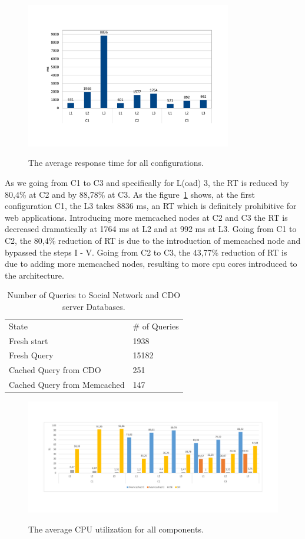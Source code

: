 \begin{figure}[h]
	\caption{The average response time for all configurations.}
	\includegraphics[width=0.8\textwidth,natwidth=200,natheight=150]{./fig/RTavg.pdf}
	\centering
	\label{fig:rtavg}
\end{figure}

As we going from C1 to C3 and specifically for L(oad) 3, the RT is reduced by 80,4\% at C2 and by 88,78\% at C3. As the figure~\ref{fig:rtavg} shows, at the first configuration C1, the L3 takes 8836 ms, an RT which is definitely prohibitive for web applications. Introducing more memcached nodes at C2 and C3 the RT is decreased dramatically at 1764 ms at L2 and at 992 ms at L3. Going from C1 to C2, the 80,4\% reduction of RT is due to the introduction of memcached node and bypassed the steps I - V. Going from C2 to C3, the 43,77\% reduction of RT is due to adding more memcached nodes, resulting to more cpu cores  introduced to the architecture.

\begin{table}[]
\centering
\caption{Number of Queries to Social Network and CDO server Databases.}
\label{tab:num_of_queries}
\begin{tabular}{ll}
State        & \# of Queries \\
Fresh start  & 1938          \\
Fresh Query  & 15182         \\
Cached Query from CDO & 251           \\
Cached Query from Memcached & 147  
\end{tabular}
\end{table} 

\begin{figure}[h]
	\caption{The average CPU utilization for all components.}
	\includegraphics[width=1.1\textwidth,natwidth=200,natheight=250]{./fig/UsageAVG.pdf} 
	\centering
	\label{fig:cpuavg}
\end{figure}

